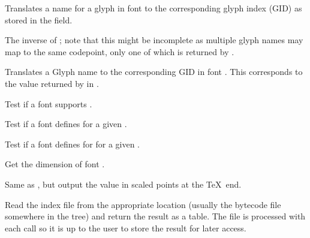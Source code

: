             Translates a name for a glyph in font  to the
            corresponding glyph index (GID) as stored in the \identifier{[index]} field.
  \endaltitem

            The inverse of ; note that this
            might be incomplete as multiple glyph names may map to the
            same codepoint, only one of which is returned by
            .
  \endaltitem

            Translates a Glyph name to the corresponding GID in font
            . This corresponds to the value returned by
            \inlinecode{\XeTeXglyphindex} in \XeTeX.
  \endaltitem

            Test if a font supports .
  \endaltitem

            Test if a font defines  for a given
            .
  \endaltitem

            Test if a font defines  for
             for a given .
  \endaltitem

            Get the dimension  of font .
  \endaltitem

            Same as , but output the value
            in scaled points at the \TeX\ end.
  \endaltitem

\endfunctionlist

\endsubsubsection


\beginfunctionlist
%
            Read the index file from the appropriate location (usually
            the bytecode file  somewhere
            in the  tree) and return the result as a
            table. The file is processed with each call so it is up to
            the user to store the result for later access.
  \endaltitem

